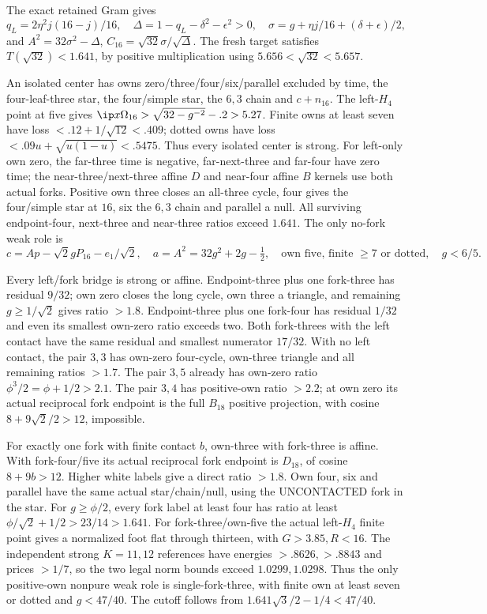 The exact retained Gram gives
\[
 q_L=2\eta^2j(16-j)/16,\quad
 \Delta=1-q_L-\delta^2-\epsilon^2>0,\quad
 \sigma=g+\eta j/16+(\delta+\epsilon)/2,
\]
and \(A^2=32\sigma^2-\Delta\),
\(C_{16}=\sqrt{32}\sigma/\sqrt\Delta\).
The fresh target satisfies \(T(\sqrt{32})<1.641\), by positive
multiplication using \(5.656<\sqrt{32}<5.657\).

An isolated center has owns zero/three/four/six/parallel excluded
by time, the four-leaf-three star, the four/simple star, the \(6,3\)
chain and \(c+n_{16}\).
The left-\(H_4\) point at five gives
\(\ip x{\Omega_{16}}>\sqrt{32-g^{-2}}-.2>5.27\).
Finite owns at least seven have loss \(<.12+1/\sqrt{12}<.409\);
dotted owns have loss
\(<.09u+\sqrt{u(1-u)}<.5475\).
Thus every isolated center is strong.
For left-only own zero, the far-three time is negative, far-next-three
and far-four have zero time; the near-three/next-three affine \(D\)
and near-four affine \(B\) kernels use both actual forks.
Positive own three closes an all-three cycle, four gives the
four/simple star at \(16\), six the \(6,3\) chain and parallel a null.
All surviving endpoint-four, next-three and near-three ratios exceed
\(1.641\). The only no-fork weak role is
\[
 c=Ap-\sqrt2gP_{16}-e_1/\sqrt2,\quad
 a=A^2=32g^2+2g-\tfrac12,\quad
 \text{own five, finite }\geq7\text{ or dotted},\quad g<6/5 .
\]

Every left/fork bridge is strong or affine.
Endpoint-three plus one fork-three has residual \(9/32\);
own zero closes the long cycle, own three a triangle, and remaining
\(g\geq1/\sqrt2\) gives ratio \(>1.8\).
Endpoint-three plus one fork-four has residual \(1/32\)
and even its smallest own-zero ratio exceeds two.
Both fork-threes with the left contact have the same residual
and smallest numerator \(17/32\).
With no left contact, the pair \(3,3\) has own-zero four-cycle,
own-three triangle and all remaining ratios \(>1.7\).
The pair \(3,5\) already has own-zero ratio
\(\phi^3/2=\phi+1/2>2.1\).
The pair \(3,4\) has positive-own ratio \(>2.2\);
at own zero its actual reciprocal fork endpoint is the full \(B_{18}\)
positive projection, with cosine \(8+9\sqrt2/2>12\), impossible.

For exactly one fork with finite contact \(b\), own-three with
fork-three is affine. With fork-four/five its actual reciprocal
fork endpoint is \(D_{18}\), of cosine \(8+9b>12\).
Higher white labels give a direct ratio \(>1.8\).
Own four, six and parallel have the same actual star/chain/null,
using the UNCONTACTED fork in the star.
For \(g\geq\phi/2\), every fork label at least four has ratio at least
\(\phi/\sqrt2+1/2>23/14>1.641\).
For fork-three/own-five the actual left-\(H_4\) finite point gives
a normalized foot flat through thirteen, with \(G>3.85,R<16\).
The independent strong \(K=11,12\) references have energies
\(>.8626,>.8843\) and prices \(>1/7\), so the two legal norm
bounds exceed \(1.0299,1.0298\).
Thus the only positive-own nonpure weak role is single-fork-three,
with finite own at least seven or dotted and \(g<47/40\).
The cutoff follows from \(1.641\sqrt3/2-1/4<47/40\).

